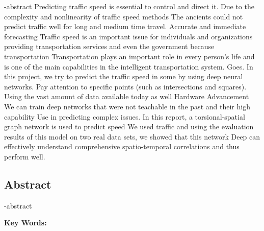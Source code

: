 
\en-abstract{
  Predicting traffic speed is essential to control and direct it. Due to the complexity and nonlinearity of traffic speed methods
The ancients could not predict traffic well for long and medium time travel. Accurate and immediate forecasting
Traffic speed is an important issue for individuals and organizations providing transportation services and even the government because transportation
Transportation plays an important role in every person's life and is one of the main capabilities in the intelligent transportation system.
Goes. In this project, we try to predict the traffic speed in some by using deep neural networks.
Pay attention to specific points (such as intersections and squares). Using the vast amount of data available today as well
Hardware Advancement We can train deep networks that were not teachable in the past and their high capability
Use in predicting complex issues. In this report, a torsional-spatial graph network is used to predict speed
We used traffic and using the evaluation results of this model on two real data sets, we showed that this network
Deep can effectively understand comprehensive spatio-temporal correlations and thus perform well.
}


\newpage
\thispagestyle{empty}
\begin{latin}
\section*{\LARGE\centering Abstract}

\een-abstract

\vspace*{.5cm}
{\large\textbf{Key Words:}}\par
\vspace*{.5cm}
\elatinkeywords
\end{latin}
